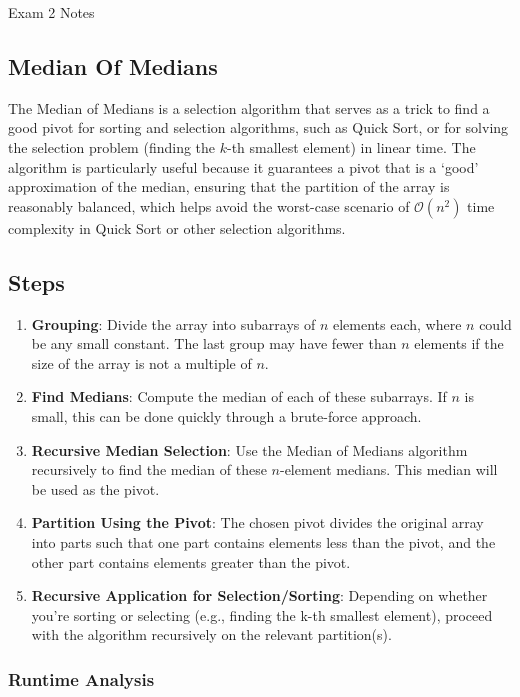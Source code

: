 \begin{examnotes}{Exam 2 Notes}
    \subsection*{Median Of Medians}

    The Median of Medians is a selection algorithm that serves as a trick to find a good pivot for sorting and selection algorithms, such as Quick Sort, or for solving the selection problem (finding 
    the $k$-th smallest element) in linear time. The algorithm is particularly useful because it guarantees a pivot that is a `good' approximation of the median, ensuring that the partition of the 
    array is reasonably balanced, which helps avoid the worst-case scenario of $\mathcal{O}(n^{2})$ time complexity in Quick Sort or other selection algorithms.

    \subsection*{Steps}
    \begin{enumerate}
        \item \textbf{Grouping}: Divide the array into subarrays of $n$ elements each, where $n$ could be any small constant. The last group may have fewer than $n$ elements if the size of the array 
        is not a multiple of $n$.
        \item \textbf{Find Medians}: Compute the median of each of these subarrays. If $n$ is small, this can be done quickly through a brute-force approach.
        \item \textbf{Recursive Median Selection}: Use the Median of Medians algorithm recursively to find the median of these $n$-element medians. This median will be used as the pivot.
        \item \textbf{Partition Using the Pivot}: The chosen pivot divides the original array into parts such that one part contains elements less than the pivot, and the other part contains elements 
        greater than the pivot.
        \item \textbf{Recursive Application for Selection/Sorting}: Depending on whether you're sorting or selecting (e.g., finding the k-th smallest element), proceed with the algorithm recursively 
        on the relevant partition(s).
    \end{enumerate}

    \subsubsection*{Runtime Analysis}


\end{examnotes}
